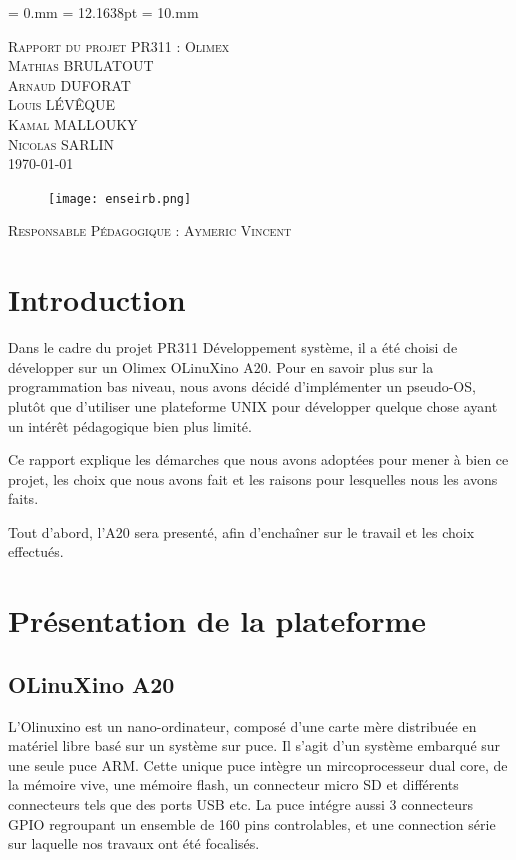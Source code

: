 \documentclass[frenchb]{article}
\begin{document}
\topmargin        = 0.mm
\headheight       = 12.1638pt
\evensidemargin   = 10.mm
\begin{titlepage}
  \begin{center}
    \textsc{\LARGE Rapport du projet PR311 : Olimex}\\[0.5cm]
    \textsc{\Large Mathias BRULATOUT\\ Arnaud DUFORAT\\ Louis L\'EV\^EQUE\\ Kamal MALLOUKY\\ Nicolas SARLIN}\\[1.5cm]
    \textsc{\Large \today }\\[1.5cm]
    \begin{figure}[h!]
      \center
      \texttt{[image: enseirb.png]}
    \end{figure}
    \vspace{1cm}
    \textsc{\Large Responsable Pédagogique : Aymeric Vincent}
  \end{center}  
\end{titlepage}
\section*{Introduction}
Dans le cadre du projet PR311 Développement système, il a été choisi de développer sur un Olimex OLinuXino A20. Pour en savoir plus sur la programmation bas niveau, nous avons décidé d'implémenter un pseudo-OS,  plutôt que d'utiliser une plateforme UNIX pour développer quelque chose ayant un intérêt pédagogique bien plus limité.

Ce rapport explique les démarches que nous avons adoptées pour mener à bien ce projet, les choix que nous avons fait et les raisons pour lesquelles nous les avons faits.

Tout d'abord, l'A20 sera presenté, afin d'enchaîner sur le travail et les choix effectués.
\clearpage
\section{Présentation de la plateforme}

\subsection{OLinuXino A20}
L'Olinuxino est un nano-ordinateur, composé d'une carte mère distribuée en matériel libre basé sur un système sur puce. Il s'agit d'un système embarqué sur une seule puce ARM. Cette unique puce intègre un mircoprocesseur dual core, de la mémoire vive, une mémoire flash, un connecteur micro SD et différents connecteurs tels que des ports USB etc. La puce intégre aussi 3 connecteurs GPIO regroupant un ensemble de 160 pins controlables, et une connection série sur laquelle nos travaux ont été focalisés.
\end{document}
